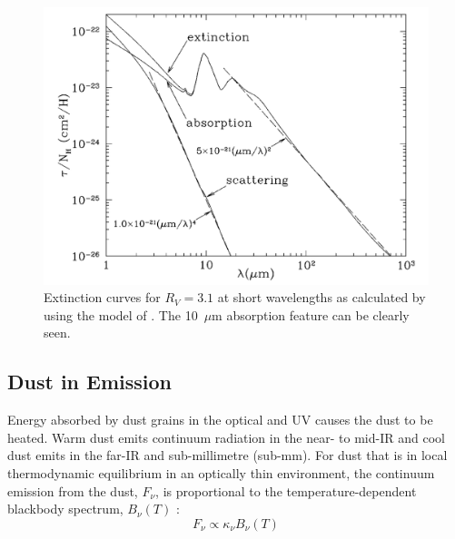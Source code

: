 \begin{figure}
\centering
\includegraphics[clip=true,scale=0.43,trim= 0 0 0 0]{chapters/chapter1/figs/extinction_curve_10um.png}
\caption{Extinction curves for  $R_V=3.1$ at short wavelengths as calculated by  \citet{Draine2003} using the model of \citet{Weingartner2001}.  The 10~$\mu$m absorption feature can be clearly seen.}
\label{fig:extinction_curve_10um}
\end{figure}

\subsection{Dust in Emission}
\label{scn:emission}
Energy absorbed by dust grains in the optical and UV causes the dust to be heated.  Warm dust emits continuum radiation in the near- to mid-IR and cool dust emits in the far-IR and sub-millimetre (sub-mm).  For dust that is in local thermodynamic equilibrium in an optically thin environment, the continuum emission from the dust, $F_{\nu}$,  is proportional to the temperature-dependent blackbody spectrum, $B_{\nu}(T)$ \citep{Hildebrand1983}:
\begin{equation}
\label{BB_flux}
F_{\nu}\propto \kappa_{\nu} B_{\nu}(T)
\end{equation}

